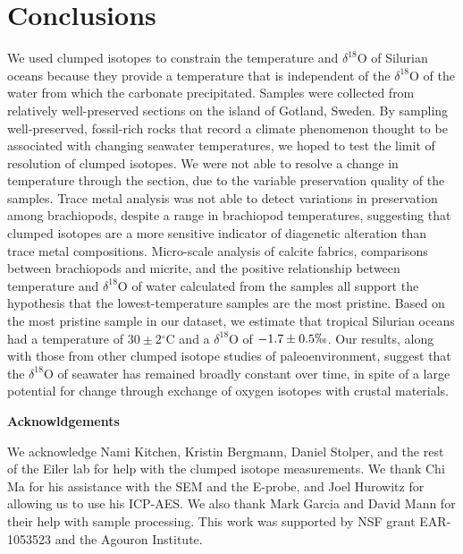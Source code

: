 \documentclass{article}
\newcommand{\deltao}{$\delta^{18}$}
\newcommand{\degrees}{$^{\circ}$}
\begin{document}
\section{Conclusions}

We used clumped isotopes to constrain the temperature and \deltao O of Silurian oceans because they provide a temperature that is independent of the \deltao O of the water from which the carbonate precipitated. Samples were collected from relatively well-preserved sections on the island of Gotland, Sweden. By sampling well-preserved, fossil-rich rocks that record a climate phenomenon thought to be associated with changing seawater temperatures, we hoped to test the limit of resolution of clumped isotopes. We were not able to resolve a change in temperature through the section, due to the variable preservation quality of the samples. Trace metal analysis was not able to detect variations in preservation among brachiopods, despite a range in brachiopod temperatures, suggesting that clumped isotopes are a more sensitive indicator of diagenetic alteration than trace metal compositions. Micro-scale analysis of calcite fabrics, comparisons between brachiopods and micrite, and the positive relationship between temperature and \deltao O of water calculated from the samples all support the hypothesis that the lowest-temperature samples are the most pristine. Based on the most pristine sample in our dataset, we estimate that tropical Silurian oceans had a temperature of  $30\pm 2$\degrees C and a \deltao O of $-1.7\pm 0.5\permil$. Our results, along with those from other clumped isotope studies of paleoenvironment, suggest that the \deltao O of seawater has remained broadly constant over time, in spite of a large potential for change through exchange of oxygen isotopes with crustal materials. 

\vspace{0.7cm} \noindent \large \textbf{Acknowldgements} \normalsize

We acknowledge Nami Kitchen, Kristin Bergmann, Daniel Stolper, and the rest of the Eiler lab for help with the clumped isotope measurements. We thank Chi Ma for his assistance with the SEM and the E-probe, and Joel Hurowitz for allowing us to use his ICP-AES. We also thank Mark Garcia and David Mann for their help with sample processing. This work was supported by NSF grant EAR-1053523 and the Agouron Institute. 

\newpage



\end{document}
